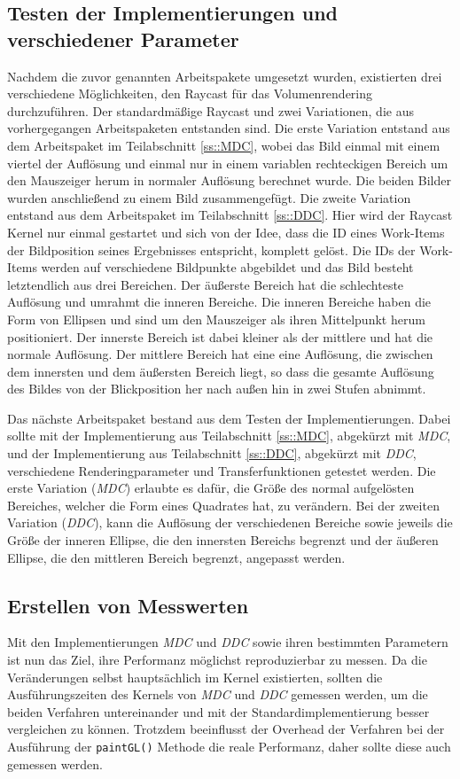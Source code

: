 \subsection{Testen der Implementierungen und verschiedener Parameter}
Nachdem die zuvor genannten Arbeitspakete umgesetzt wurden, existierten drei verschiedene Möglichkeiten, den Raycast für das Volumenrendering durchzuführen.
Der standardmäßige Raycast und zwei Variationen, die aus vorhergegangen Arbeitspaketen entstanden sind.
Die erste Variation entstand aus dem Arbeitspaket im Teilabschnitt \ref{ss::MDC}, wobei das Bild einmal mit einem viertel der Auflösung und einmal nur in einem variablen rechteckigen Bereich um den Mauszeiger herum in normaler Auflösung berechnet wurde.
Die beiden Bilder wurden anschließend zu einem Bild zusammengefügt.
Die zweite Variation entstand aus dem Arbeitspaket im Teilabschnitt \ref{ss::DDC}.
Hier wird der Raycast Kernel nur einmal gestartet und sich von der Idee, dass die ID eines Work-Items der Bildposition seines Ergebnisses entspricht, komplett gelöst.
Die IDs der Work-Items werden auf verschiedene Bildpunkte abgebildet und das Bild besteht letztendlich aus drei Bereichen.
Der äußerste Bereich hat die schlechteste Auflösung und umrahmt die inneren Bereiche.
Die inneren Bereiche haben die Form von Ellipsen und sind um den Mauszeiger als ihren Mittelpunkt herum positioniert.
Der innerste Bereich ist dabei kleiner als der mittlere und hat die normale Auflösung.
Der mittlere Bereich hat eine eine Auflösung, die zwischen dem innersten und dem äußersten Bereich liegt, so dass die gesamte Auflösung des Bildes von der Blickposition her nach außen hin in zwei Stufen abnimmt.

Das nächste Arbeitspaket bestand aus dem Testen der Implementierungen.
Dabei sollte mit der Implementierung aus Teilabschnitt \ref{ss::MDC}, abgekürzt mit \emph{MDC}, und der Implementierung aus Teilabschnitt \ref{ss::DDC}, abgekürzt mit \emph{DDC}, verschiedene Renderingparameter und Transferfunktionen getestet werden.
Die erste Variation (\emph{MDC}) erlaubte es dafür, die Größe des normal aufgelösten Bereiches, welcher die Form eines Quadrates hat, zu verändern.
Bei der zweiten Variation (\emph{DDC}), kann die Auflösung der verschiedenen Bereiche sowie jeweils die Größe der inneren Ellipse, die den innersten Bereichs begrenzt und der äußeren Ellipse, die den mittleren Bereich begrenzt, angepasst werden.

\subsection{Erstellen von Messwerten}\label{sec::workpacks::evm}
Mit den Implementierungen \emph{MDC} und \emph{DDC} sowie ihren bestimmten Parametern ist nun das Ziel, ihre Performanz möglichst reproduzierbar zu messen. Da die Veränderungen selbst hauptsächlich im Kernel existierten, sollten die Ausführungszeiten des Kernels von \emph{MDC} und \emph{DDC} gemessen werden, um die beiden Verfahren untereinander und mit der Standardimplementierung besser vergleichen zu können.
Trotzdem beeinflusst der Overhead der Verfahren bei der Ausführung der \texttt{paintGL()} Methode die reale Performanz, daher sollte diese auch gemessen werden.

